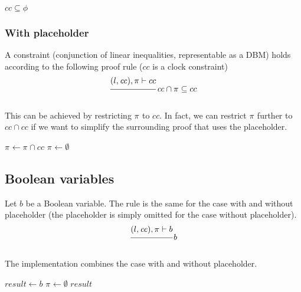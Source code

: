 \documentclass{article}
\newcommand{\proofrule}[3][]{#1 \frac{\raisebox{.7ex}{\normalsize{$#2$}}}
  {\raisebox{-1.0ex}{\normalsize{$#3$}}}}
\newcommand{\placeholder}[1][]{\pi_{#1}}
\newcommand{\loc}{l}
\newcommand{\region}{\mathit{cc}}
\newcommand{\var}[1]{\ensuremath{\mathit{#1}}}
\newcommand{\method}[1]{\ensuremath{\mathbf{#1}}}
\begin{document}
\begin{algorithm}[H]
  \caption{$\method{do\_proof\_constraint}(\loc, \region, \phi)$}
  \begin{algorithmic}
  \RETURN $\region \subseteq \phi$
\end{algorithmic}
\end{algorithm}

\subsubsection{With placeholder}
A constraint (conjunction of linear inequalities, representable as a DBM) holds according to the following proof rule ($cc$ is a clock constraint)
\[
  \proofrule
  {(\loc, \region), \placeholder \vdash cc}
  {}
  \region \cap \placeholder \subseteq cc
\]

This can be achieved by restricting $\placeholder$ to $cc$. In fact, we can restrict $\placeholder$ further to $cc \cap \region$ if we want to simplify the surrounding proof that uses the placeholder.
\begin{algorithm}[H]
  \caption{$\method{do\_proof\_place\_constraint}(\loc, \region, \placeholder, \phi)$}
  \begin{algorithmic}
  \IF{$\region \not \subseteq cc$}
    \STATE $\placeholder \gets \placeholder \cap cc$
    \IF{$\placeholder \cap \region = \emptyset$}
      \STATE $\placeholder \gets \emptyset$
    \ENDIF
  \ENDIF
\end{algorithmic}
\end{algorithm}


\subsection{Boolean variables}

Let $b$ be a Boolean variable. The rule is the same for the case with and without placeholder (the placeholder is simply omitted for the case without placeholder).
\[
  \proofrule
  {(\loc, \region), \placeholder \vdash b}
  {}
  b
\]

The implementation combines the case with and without placeholder.
\begin{algorithm}[H]
  \caption{$\method{do\_proof\_place\_bool}(\loc, \region, \placeholder, b)$}
  \begin{algorithmic}
  \STATE $\var{result} \gets b$
  \IF{$\lnot \var{result}$}
    \STATE $\placeholder \gets \emptyset$
  \ENDIF
  \RETURN $\var{result}$
\end{algorithmic}
\end{algorithm}
\end{document}

